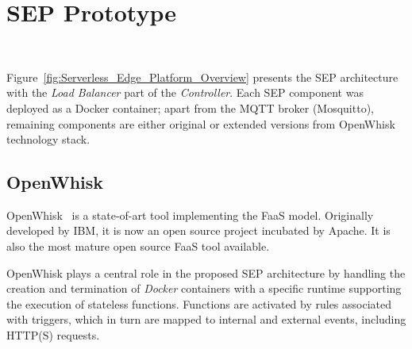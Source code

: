 \section{SEP Prototype}~\label{sec:prototype}





Figure~\ref{fig:Serverless_Edge_Platform_Overview} presents the SEP architecture with the \textit{Load Balancer} part of the \textit{Controller}. Each SEP component was deployed as a Docker container; apart from the MQTT broker (Mosquitto), remaining components are either original or extended versions from OpenWhisk technology stack.


\subsection{OpenWhisk}

OpenWhisk~\cite{OpenWhisk} is a state-of-art tool implementing the FaaS model. Originally developed by IBM, it is now an open source project incubated by Apache. It is also the most mature open source FaaS tool available. 

OpenWhisk plays a central role in the proposed SEP architecture %
by handling the creation and termination of \textit{Docker} containers
with a specific runtime supporting the execution of stateless functions. Functions are activated by rules associated with triggers, which in turn are mapped to internal and external events, including HTTP(S) requests. %


